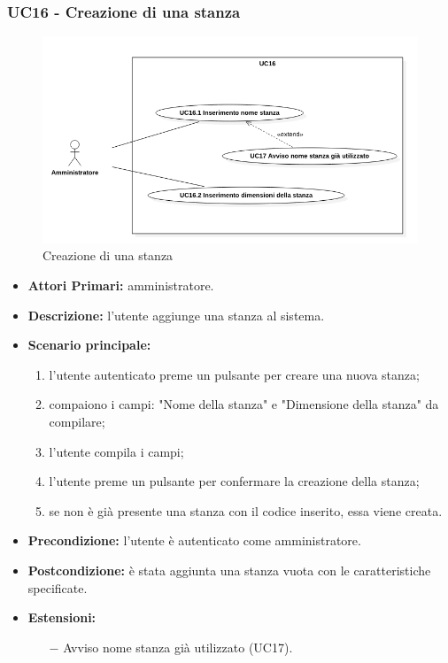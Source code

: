 \subsubsection{ UC16 - Creazione di una stanza}
\begin{figure}[H]
	\centering
	\includegraphics[width=18cm]{res/images/UC16Nuovo.png}
	\caption{Creazione di una stanza}
\end{figure}
\begin{itemize}
	\item\textbf{Attori Primari:}
	amministratore.
	\item\textbf{Descrizione:} 
	l'utente aggiunge una stanza al sistema.
	\item\textbf{Scenario principale:} 
	\begin{enumerate}
		\item l'utente autenticato preme un pulsante per creare una nuova stanza;
		\item compaiono i campi: "Nome della stanza" e "Dimensione della stanza" da compilare;
		\item l'utente compila i campi;
		\item l'utente preme un pulsante per confermare la creazione della stanza;
		\item se non è già presente una stanza con il codice inserito, essa viene creata.
	\end{enumerate}
	\item\textbf{Precondizione:} 
	l'utente è autenticato come amministratore.
	\item\textbf{Postcondizione:}
	è stata aggiunta una stanza vuota con le caratteristiche specificate.
	\item\textbf{Estensioni:}
	\begin{itemize}
		\item[$-$] Avviso nome stanza già utilizzato (UC17).
	\end{itemize}
\end{itemize}
